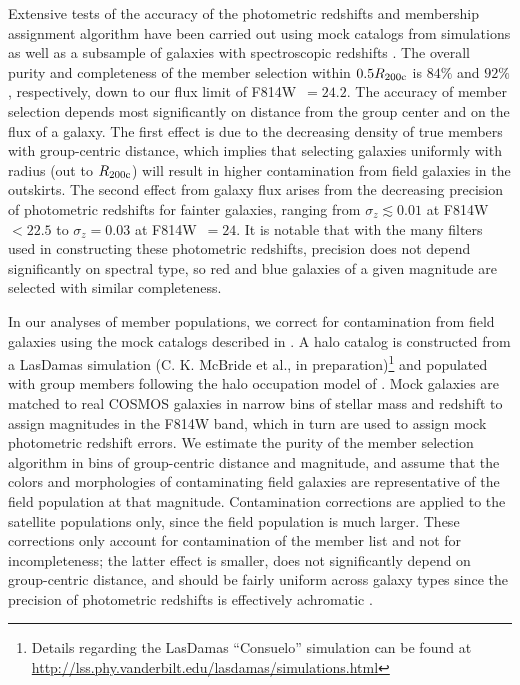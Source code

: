 \documentclass[12pt]{emulateapj}
\begin{document}
Extensive tests of the accuracy of the photometric redshifts and
membership assignment algorithm have been carried out using mock
catalogs from simulations as well as a subsample of galaxies with
spectroscopic redshifts \citep{George2011}. The overall purity and
completeness of the member selection within $0.5 R_{\rm 200c}$ is $84\%$
and $92\%$, respectively, down to our
flux limit of F814W~$=24.2$. The
accuracy of member selection depends most significantly on distance
from the group center and on the flux of a galaxy. The first effect is
due to the decreasing density of true members with group-centric
distance, which implies that selecting galaxies uniformly with radius
(out to $R_{\rm 200c}$) will result in higher contamination from field
galaxies in the outskirts. The second effect from galaxy flux arises
from the decreasing precision of photometric redshifts for fainter
galaxies, ranging from $\sigma_z \lesssim 0.01$ at F814W~$< 22.5$ to
$\sigma_z=0.03$ at F814W~$= 24$. It is notable that with the many
filters used in constructing these photometric redshifts, precision
does not depend significantly on spectral type, so red and blue galaxies of a
given magnitude are selected with similar completeness.

In our analyses of member populations, we correct for contamination
from field galaxies using the mock catalogs described in
\citet{George2011}. A halo catalog is constructed from a LasDamas
simulation (C. K. McBride et al., in preparation)\footnote{Details
  regarding the LasDamas ``Consuelo'' simulation can be found at
  \url{http://lss.phy.vanderbilt.edu/lasdamas/simulations.html}} and
populated with group members following the halo occupation model of
\citet{Leauthaud2012}. Mock galaxies are matched to real COSMOS
galaxies in narrow bins of stellar mass and redshift to assign
magnitudes in the F814W band, which in turn are used to assign mock photometric redshift
errors. We estimate the purity of the member selection algorithm in
bins of group-centric distance and magnitude, and assume that the
colors and morphologies of contaminating field galaxies are
representative of the field population at that
magnitude. Contamination corrections are applied to the satellite
populations only, since the field population is much larger. These
corrections only account for contamination of the member list and not
for incompleteness; the latter effect is smaller, does not
significantly depend on group-centric distance, and should be fairly
uniform across galaxy types since the precision of photometric
redshifts is effectively achromatic \citep[see Figures 2 and 5 of][]{George2011}.
\end{document}

